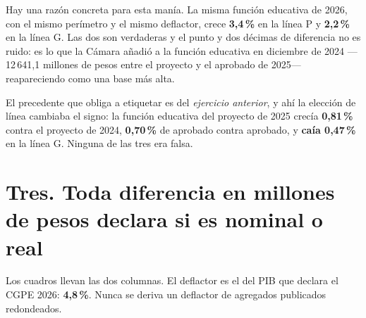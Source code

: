 Hay una razón concreta para esta manía. La misma función educativa de 2026, con el mismo
perímetro y el mismo deflactor, crece \textbf{3,4\,\%} en la línea P y \textbf{2,2\,\%} en la
línea G. Las dos son verdaderas y el punto y dos décimas de diferencia no es ruido: es lo que
la Cámara añadió a la función educativa en diciembre de 2024 ---12\,641,1 millones de pesos
entre el proyecto y el aprobado de 2025--- reapareciendo como una base más alta.

El precedente que obliga a etiquetar es del \emph{ejercicio anterior}, y ahí la elección de
línea cambiaba el signo: la función educativa del proyecto de 2025 crecía \textbf{0,81\,\%}
contra el proyecto de 2024, \textbf{0,70\,\%} de aprobado contra aprobado, y \textbf{caía
0,47\,\%} en la línea G. Ninguna de las tres era falsa.

\section*{Tres. Toda diferencia en millones de pesos declara si es nominal o real}

Los cuadros llevan las dos columnas. El deflactor es el del PIB que declara el CGPE 2026:
\textbf{4,8\,\%}. Nunca se deriva un deflactor de agregados publicados redondeados.


